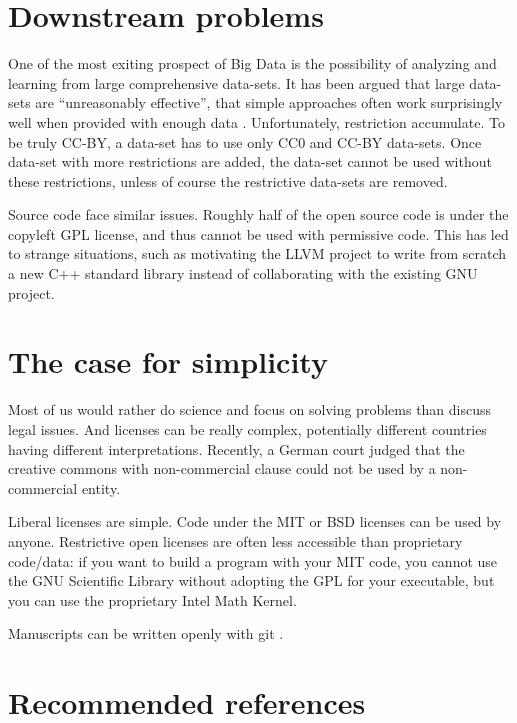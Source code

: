 \documentclass[letterpaper]{article}
\begin{document}
\section{Downstream problems}

One of the most exiting prospect of Big Data is the possibility of analyzing
and learning from large comprehensive data-sets. It has been argued that
large data-sets are ``unreasonably effective'', that simple approaches often
work surprisingly well when provided with enough data \cite{hal09}. Unfortunately,
restriction accumulate. To be truly CC-BY, a data-set has to use only CC0 and
CC-BY data-sets. Once data-set with more restrictions are added, the data-set
cannot be used without these restrictions, unless of course the restrictive
data-sets are removed.

Source code face similar issues. Roughly half of the open source code is
under the copyleft GPL license, and thus cannot be used with permissive
code. This has led to strange situations, such as motivating the LLVM project
to write from scratch a new C++ standard library instead of collaborating
with the existing GNU project.


\section{The case for simplicity}

Most of us would rather do science and focus on solving problems than discuss
legal issues.  And licenses can be really complex, potentially different
countries having different interpretations. Recently, a German court judged
that the creative commons with non-commercial clause could not be used by
a non-commercial entity. %

Liberal licenses are simple. Code under the MIT or BSD licenses can be used by
anyone. Restrictive open licenses are often less accessible than proprietary
code/data: if you want to build a program with your MIT code, you cannot use
the GNU Scientific Library without adopting the GPL for your executable, but
you can use the proprietary Intel Math Kernel.

Manuscripts can be written openly with git \cite{ram13}.

\section{Recommended references}
\end{document}
